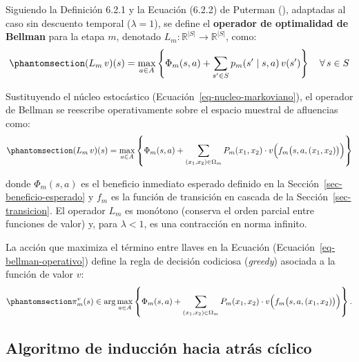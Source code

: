\documentclass[
  spanish,
  letterpaper,
]{scrreprt}
\theoremstyle{definition}
\theoremstyle{remark}
\begin{document}
Siguiendo la Definición 6.2.1 y la Ecuación (6.2.2) de Puterman
(), adaptadas al caso sin
descuento temporal (\(\lambda = 1\)), se define el \textbf{operador de
optimalidad de Bellman} para la etapa \(m\), denotado
\(L_m: \mathbb{R}^{|S|} \to \mathbb{R}^{|S|}\), como:
\begin{equation}\protect\phantomsection\label{eq-operador-bellman-etapa}{
(L_m\, v)(s) = \max_{a \in A} \left\{ \Phi_m(s, a) + \sum_{s' \in S} p_m(s' \mid s, a)\, v(s') \right\} \quad \forall\, s \in S
}\end{equation}

Sustituyendo el núcleo estocástico
(Ecuación~\ref{eq-nucleo-markoviano}), el operador de Bellman se
reescribe operativamente sobre el espacio muestral de afluencias como:
\begin{equation}\protect\phantomsection\label{eq-bellman-operativo}{
(L_m\, v)(s) = \max_{a \in A} \left\{ \Phi_m(s, a) + \sum_{(x_1, x_2) \in \Omega_m} P_m(x_1, x_2) \cdot v\Bigl(f_m\bigl(s, a, (x_1, x_2)\bigr)\Bigr) \right\}
}\end{equation}

donde \(\Phi_m(s,a)\) es el beneficio inmediato esperado definido en la
Sección~\ref{sec-beneficio-esperado} y \(f_m\) es la función de
transición en cascada de la Sección~\ref{sec-transicion}. El operador
\(L_m\) es monótono (conserva el orden parcial entre funciones de valor)
y, para \(\lambda < 1\), es una contracción en norma infinito.

La acción que maximiza el término entre llaves en la Ecuación
(Ecuación~\ref{eq-bellman-operativo}) define la regla de decisión
codiciosa (\emph{greedy}) asociada a la función de valor \(v\):
\begin{equation}\protect\phantomsection\label{eq-regla-greedy}{
\pi_m^v(s) \in \arg\max_{a \in A} \left\{ \Phi_m(s, a) + \sum_{(x_1, x_2) \in \Omega_m} P_m(x_1, x_2) \cdot v\Bigl(f_m\bigl(s, a, (x_1, x_2)\bigr)\Bigr) \right\}.
}\end{equation}

\subsection{Algoritmo de inducción hacia atrás
cíclico}\label{algoritmo-de-inducciuxf3n-hacia-atruxe1s-cuxedclico}
\end{document}
